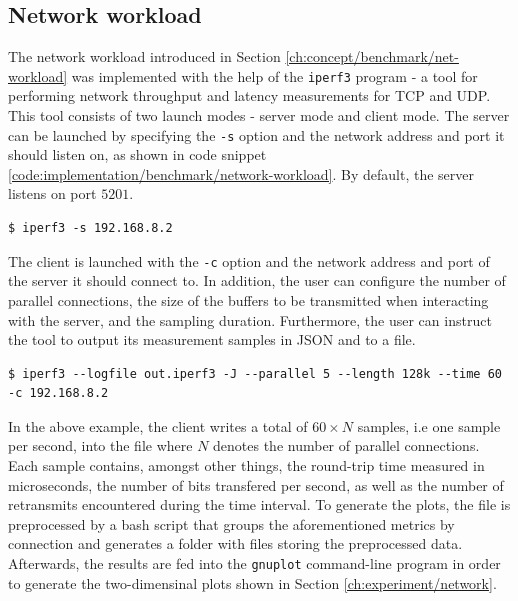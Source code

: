 \subsection{Network workload}
The network workload introduced in Section \ref{ch:concept/benchmark/net-workload} 
was implemented with the help of the \verb|iperf3| program - a tool 
for performing network throughput and latency measurements for TCP and UDP.
This tool consists of two launch modes - server mode and client mode. 
The server can be launched by specifying the \verb|-s| option and the 
network address and port it should listen on, as shown in code snippet \ref{code:implementation/benchmark/network-workload}. 
By default, the server listens on port $5201$. 
\begin{lstlisting}[label={code:implementation/benchmark/network-workload}, style=bash, caption={Launching an iperf3 TCP server}]
$ iperf3 -s 192.168.8.2
\end{lstlisting}
The client is launched with the \verb|-c| option and the network address and port 
of the server it should connect to. In addition, the user can configure the 
number of parallel connections, the size of the buffers to be transmitted 
when interacting with the server, and the sampling duration. Furthermore,
the user can instruct the tool to output its measurement samples in JSON and to a file.
\begin{lstlisting}[label={code:implementation/benchmark/network-workload}, style=bash, caption={Launching an iperf3 TCP client that connects to an iperf3 server listening on 192.168.8.2 and writes performance samples gathered for 60 seconds from 5 parallel connections into a file}]
$ iperf3 --logfile out.iperf3 -J --parallel 5 --length 128k --time 60 -c 192.168.8.2
\end{lstlisting}
In the above example, the client writes a total of $60 \times N$ samples, i.e one sample per second, into the file where $N$ denotes the number of 
parallel connections. Each sample contains, amongst other things, the round-trip time measured in microseconds, the 
number of bits transfered per second, as well as the number of retransmits encountered during the time interval. 
To generate the plots, the file is preprocessed by a bash script that groups the aforementioned metrics
by connection and generates a folder with files storing the preprocessed data. Afterwards, the results are fed into the 
\verb|gnuplot| command-line program in order to generate the two-dimensinal plots shown in Section \ref{ch:experiment/network}.

